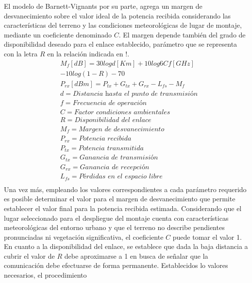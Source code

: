 \documentclass[conference]{IEEEtran}
\begin{document}
El modelo de Barnett-Vignants por su parte, agrega un margen de desvanecimiento sobre el valor ideal de
la potencia recibida considerando las características del terreno y las condiciones meteorológicas de lugar
de montaje, mediante un coeficiente denominado $C$. El margen depende también del grado de disponibilidad deseado 
para el enlace establecido, parámetro que se representa con la letra $R$ en la relación indicada en !. 
\begin{equation}
    \label{eq:Eq6}
    \begin{aligned}
        &M_{f}[dB] = 30logd[Km] + 10log6Cf[GHz]\\
        & - 10log(1-R) - 70\\
        &P_{rx}[dBm] = P_{tx} + G_{tx} + G_{rx} - L_{fs} - M_{f}\\
        &d = \textit{Distancia hasta el punto de transmisión}\\
        &f = \textit{Frecuencia de operación}\\
        &C = \textit{Factor condiciones ambientales}\\
        &R = \textit{Disponibilidad del enlace}\\
        &M_{f} = \textit{Margen de desvanecimiento}\\
        &P_{rx} = \textit{Potencia recibida}\\
        &P_{tx} = \textit{Potencia transmitida}\\
        &G_{tx} = \textit{Ganancia de transmisión}\\
        &G_{rx} = \textit{Ganancia de recepción}\\
        &L_{fs} = \textit{Pérdidas en el espacio libre}\\
    \end{aligned}
\end{equation}
Una vez más, empleando los valores correspondientes a cada parámetro requerido es posible determinar el valor
para el margen de desvanecimiento que permite establecer el valor final para la potencia recibida estimada. Considerando
que el lugar seleccionado para el despliegue del montaje cuenta con características meteorológicas del entorno urbano y
que el terreno no describe pendientes pronunciadas ni vegetación significativa, el coeficiente $C$ puede tomar el valor 1.
En cuanto a la disponibilidad del enlace, se establece que dada la baja distancia a cubrir el valor de $R$ debe aproximarse 
a 1 en busca de señalar que la comunicación debe efectuarse de forma permanente. Establecidos lo valores necesarios, el procedimiento 
\end{document}
